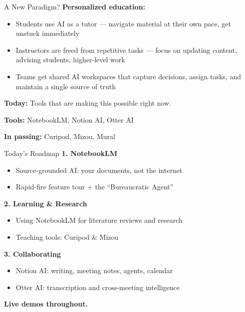 \documentclass[aspectratio=169]{beamer}
\begin{document}
\begin{frame}{A New Paradigm?}
    \textbf{Personalized education:}
    \begin{itemize}
        \item Students use AI as a tutor --- navigate material at their own pace, get unstuck immediately
        \item Instructors are freed from repetitive tasks --- focus on updating content, advising students, higher-level work
        \item Teams get shared AI workspaces that capture decisions, assign tasks, and maintain a single source of truth
    \end{itemize}

    \vspace{1em}
    \textbf{Today:} Tools that are making this possible right now.

    \vspace{1em}
    \textbf{Tools:} NotebookLM, Notion AI, Otter AI

    \vspace{0.3em}
    \textbf{In passing:} Curipod, Mizou, Mural
\end{frame}

\begin{frame}{Today's Roadmap}
    \textbf{1. NotebookLM}
    \begin{itemize}
        \item Source-grounded AI: your documents, not the internet
        \item Rapid-fire feature tour + the ``Bureaucratic Agent''
    \end{itemize}

    \vspace{0.8em}
    \textbf{2. Learning \& Research}
    \begin{itemize}
        \item Using NotebookLM for literature reviews and research
        \item Teaching tools: Curipod \& Mizou
    \end{itemize}

    \vspace{0.8em}
    \textbf{3. Collaborating}
    \begin{itemize}
        \item Notion AI: writing, meeting notes, agents, calendar
        \item Otter AI: transcription and cross-meeting intelligence
    \end{itemize}

    \vspace{0.8em}
    \textbf{Live demos throughout.}
\end{frame}
\end{document}
